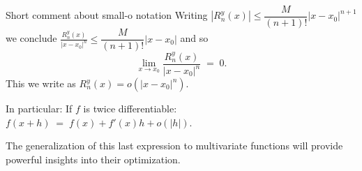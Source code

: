 \documentclass[11pt,aspectratio=169]{beamer}
\begin{document}


\begin{frame}{Short comment about small-o notation}
	Writing $|R_n^y(x)|\le \dfrac{M}{(n+1)!}|x-x_0|^{n+1}$ we conclude $\tfrac{R^y_n(x)}{|x-x_0|^{n}}\leq \dfrac{M}{(n+1)!}|x-x_0|$ and so
	$$
	\lim_{x\to x_0} \frac{R^y_n(x)}{|x-x_0|^{n}}\;=\;0.
	$$
	This we write as $ R^y_n(x)=o(|x-x_0|^{n})$.\\[5mm]
	
\begin{alertblock}{In particular: If $f$ is twice differentiable:}
	$f(x+h)\;=\;f(x)+f'(x)h + o(|h|)$.
\end{alertblock}
The generalization of this last expression to multivariate functions will provide powerful insights into their optimization. 
\end{frame}
\end{document}
